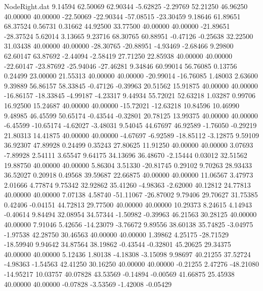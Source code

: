 \begin{filecontents}{NodeRight.dat}
   9.14594   62.50069   62.90344    -5.62825   -2.29769   52.21250   46.96250   40.00000   40.00000  -22.50069  -22.90344  -57.08515  -23.30459
   9.18646   61.89651   68.37524     0.56731    0.31662   44.92500   33.77500   40.00000   40.00000  -21.89651  -28.37524    5.62014    3.13665
   9.23716   68.30765   60.88951    -0.47126   -0.25638   32.22500   31.03438   40.00000   40.00000  -28.30765  -20.88951   -4.93469   -2.68466
   9.29800   62.60147   63.87692    -2.44094   -2.58419   27.71250   22.85938   40.00000   40.00000  -22.60147  -23.87692  -25.94046  -27.46281
   9.34846   60.99014   56.76085     0.13756    0.24499   23.00000   21.55313   40.00000   40.00000  -20.99014  -16.76085    1.48003    2.63600
   9.39889   56.86157   58.33845    -0.47126   -0.39963   20.51562   15.91875   40.00000   40.00000  -16.86157  -18.33845   -4.99187   -4.23317
   9.44934   55.72021   52.63218     1.03287    0.99706   16.92500   15.24687   40.00000   40.00000  -15.72021  -12.63218   10.84596   10.46990
   9.48985   46.45599   50.65174    -0.43544   -0.32801   20.78125   13.99375   40.00000   40.00000   -6.45599  -10.65174   -4.62027   -3.48031
   9.54045   44.67697   46.92589    -1.76050   -0.29219   21.80313   14.41875   40.00000   40.00000   -4.67697   -6.92589  -18.85112   -3.12875
   9.59109   36.92307   47.89928     0.24499    0.35243   27.80625   11.91250   40.00000   40.00000    3.07693   -7.89928    2.54111    3.65547
   9.64175   34.13696   36.48670    -2.15444    0.03012   32.51562   19.88750   40.00000   40.00000    5.86304    3.51330  -20.81745    0.29102
   9.70263   28.93433   36.52027     0.20918    0.49568   39.59687   22.66875   40.00000   40.00000   11.06567    3.47973    2.01666    4.77874
   9.75342   32.92862   35.41260    -4.98363   -2.62000   40.12812   24.77813   40.00000   40.00000    7.07138    4.58740  -51.11067  -26.87002
   9.79406   29.70627   31.75385     0.42406   -0.04151   44.72813   29.77500   40.00000   40.00000   10.29373    8.24615    4.14943   -0.40614
   9.84494   32.08954   34.57344    -1.50982   -0.39963   46.21563   30.28125   40.00000   40.00000    7.91046    5.42656  -14.23079   -3.76672
   9.89556   38.60138   35.74825    -3.04975   -1.97538   42.28750   30.46563   40.00000   40.00000    1.39862    4.25175  -28.71529  -18.59940
   9.94642   34.87564   38.19862    -0.43544   -0.32801   45.20625   29.34375   40.00000   40.00000    5.12436    1.80138   -4.18308   -3.15098
   9.98697   40.21255   37.52724    -4.98363   -1.54563   42.41250   30.16250   40.00000   40.00000   -0.21255    2.47276  -48.21080  -14.95217
  10.03757   40.07828   43.53569    -0.14894   -0.00569   41.66875   25.45938   40.00000   40.00000   -0.07828   -3.53569   -1.42008   -0.05429

\end{filecontents}
